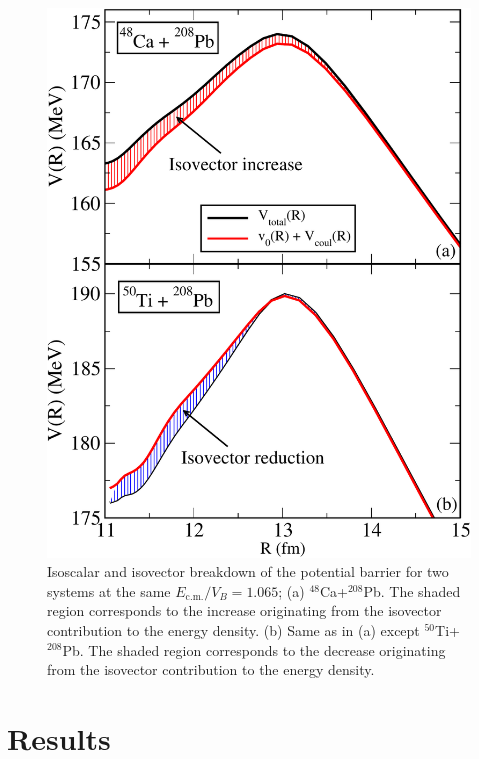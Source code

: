\begin{figure}
	\includegraphics*[width=\textwidth]{../Figures/Isospin/V_CaTi_Pb_stack_2.pdf}
	\caption{Isoscalar and isovector breakdown of the potential barrier for two
		systems at the same $E_\mathrm{c.m.}/V_B=1.065$;
		(a) $^{48}$Ca+$^{208}$Pb. The shaded region corresponds to the increase originating
		from the isovector contribution to
		the energy density.
		(b) Same as in (a) except $^{50}$Ti+$^{208}$Pb.
		The shaded region corresponds to the decrease originating from the isovector contribution to
		the energy density.}
	\label{fig:CaTi_Pb}
\end{figure}

\section{Results}

